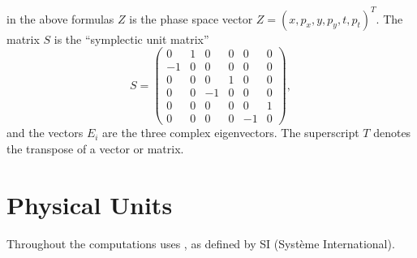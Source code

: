 in the above formulas $Z$ is the phase space vector
$Z = (x, p_x, y, p_y, t, p_t)^T$.
The matrix $S$ is the ``symplectic unit matrix''
\[
S = 
\begin{pmatrix} 
    0 & 1 & 0 & 0 & 0 & 0 \\
   -1 & 0 & 0 & 0 & 0 & 0 \\
    0 & 0 & 0 & 1 & 0 & 0 \\
    0 & 0 &-1 & 0 & 0 & 0 \\
    0 & 0 & 0 & 0 & 0 & 1 \\
    0 & 0 & 0 & 0 &-1 & 0
  \end{pmatrix},
\]
and the vectors $E_i$ are the three complex eigenvectors.
The superscript $T$ denotes the transpose of a vector or matrix.

\section{Physical Units}
\label{sec:units}
Throughout the computations \opal uses ,
as defined by SI (Syst\`eme International).

